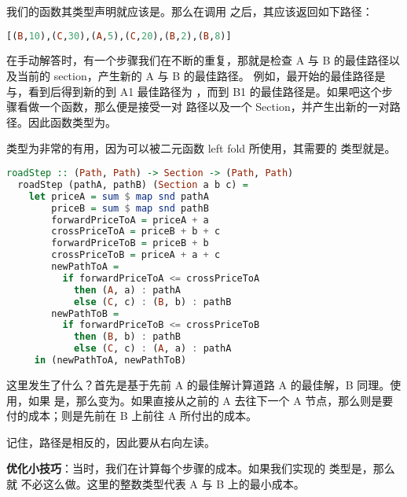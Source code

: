 \documentclass[./main.tex]{subfiles}
\begin{document}
我们的函数其类型声明就应该是。那么在调用
之后，其应该返回如下路径：

\begin{lstlisting}[language=Haskell]
  [(B,10),(C,30),(A,5),(C,20),(B,2),(B,8)]
\end{lstlisting}

在手动解答时，有一个步骤我们在不断的重复，那就是检查 A 与 B 的最佳路径以及当前的 section，产生新的 A 与 B 的最佳路径。
例如，最开始的最佳路径是\acode{[]}与\acode{[]}，看到后得到新的到 A1 最佳路径为
\acode{[(B,10),(C,30)]}，而到 B1 的最佳路径是\acode{[(B,10)]}。如果吧这个步骤看做一个函数，那么便是接受一对
路径以及一个 Section，并产生出新的一对路径。因此函数类型为。

\begin{anote}
  类型为非常的有用，因为可以被二元函数 left fold 所使用，其需要的
  类型就是。
\end{anote}

\begin{lstlisting}[language=Haskell]
  roadStep :: (Path, Path) -> Section -> (Path, Path)
  roadStep (pathA, pathB) (Section a b c) =
    let priceA = sum $ map snd pathA
        priceB = sum $ map snd pathB
        forwardPriceToA = priceA + a
        crossPriceToA = priceB + b + c
        forwardPriceToB = priceB + b
        crossPriceToB = priceA + a + c
        newPathToA =
          if forwardPriceToA <= crossPriceToA
            then (A, a) : pathA
            else (C, c) : (B, b) : pathB
        newPathToB =
          if forwardPriceToB <= crossPriceToB
            then (B, b) : pathB
            else (C, c) : (A, a) : pathA
     in (newPathToA, newPathToB)
\end{lstlisting}

这里发生了什么？首先是基于先前 A 的最佳解计算道路 A 的最佳解，B 同理。使用，如果
是\acode{[(A,100),(C,20)]}，那么变为。如果直接从之前的 A 去往下一个
A 节点，那么则是要付的成本；则是先前在 B 上前往 A 所付出的成本。

记住，路径是相反的，因此要从右向左读。

\begin{anote}
  \textbf{优化小技巧}：当时，我们在计算每个步骤的成本。如果我们实现的
  类型是，那么就
  不必这么做。这里的整数类型代表 A 与 B 上的最小成本。
\end{anote}
\end{document}
